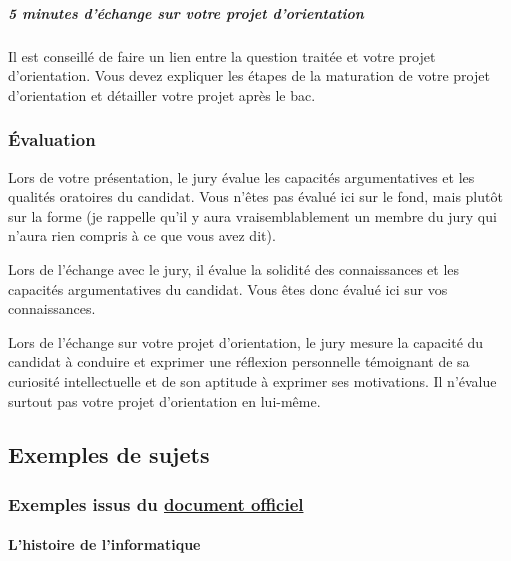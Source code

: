 \documentclass[
  letterpaper,
  DIV=11,
  numbers=noendperiod]{scrartcl}
\let\oldparagraph\paragraph
\renewcommand{\paragraph}[1]{\oldparagraph{#1}\mbox{}}
\let\oldsubparagraph\subparagraph
\renewcommand{\subparagraph}[1]{\oldsubparagraph{#1}\mbox{}}
\begin{document}
\hypertarget{minutes-duxe9change-sur-votre-projet-dorientation}{%
\subparagraph{5 minutes d'échange sur votre projet
d'orientation}\label{minutes-duxe9change-sur-votre-projet-dorientation}}

Il est conseillé de faire un lien entre la question traitée et votre
projet d'orientation. Vous devez expliquer les étapes de la maturation
de votre projet d'orientation et détailler votre projet après le bac.

\hypertarget{uxe9valuation}{%
\subsubsection{Évaluation}\label{uxe9valuation}}

Lors de votre présentation, le jury évalue les capacités argumentatives
et les qualités oratoires du candidat. Vous n'êtes pas évalué ici sur le
fond, mais plutôt sur la forme (je rappelle qu'il y aura
vraisemblablement un membre du jury qui n'aura rien compris à ce que
vous avez dit).

Lors de l'échange avec le jury, il évalue la solidité des connaissances
et les capacités argumentatives du candidat. Vous êtes donc évalué ici
sur vos connaissances.

Lors de l'échange sur votre projet d'orientation, le jury mesure la
capacité du candidat à conduire et exprimer une réflexion personnelle
témoignant de sa curiosité intellectuelle et de son aptitude à exprimer
ses motivations. Il n'évalue surtout pas votre projet d'orientation en
lui-même.

\hypertarget{exemples-de-sujets}{%
\subsection{Exemples de sujets}\label{exemples-de-sujets}}

\hypertarget{exemples-issus-du-document-officiel}{%
\subsubsection{\texorpdfstring{Exemples issus du
\href{https://eduscol.education.fr/document/3919/download}{document
officiel}}{Exemples issus du document officiel}}\label{exemples-issus-du-document-officiel}}

\hypertarget{lhistoire-de-linformatique}{%
\paragraph{L'histoire de
l'informatique}\label{lhistoire-de-linformatique}}
\end{document}

